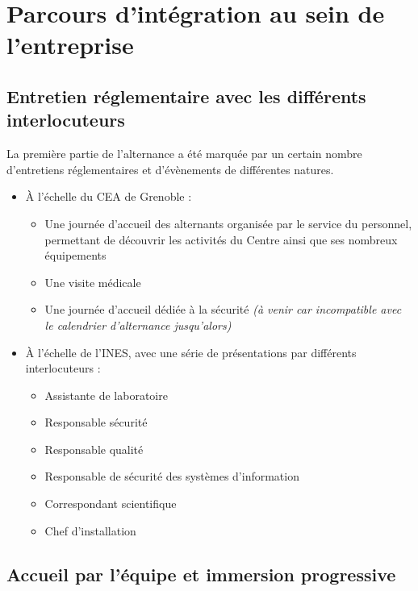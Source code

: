 \chapter{Parcours d'intégration au sein de l'entreprise}\label{ch:parcours-d'integration-au-sein-de-l'entreprise}


\section{Entretien réglementaire avec les différents interlocuteurs}\label{sec:entretien-reglementaire-avec-les-differents-interlocuteurs}

    La première partie de l'alternance a été marquée par un certain nombre d'entretiens réglementaires et d'évènements de différentes natures.

    \begin{itemize}
        \item À l'échelle du \gls{CEA} de Grenoble :
        \begin{itemize}
            \item Une journée d'accueil des alternants organisée par le service du personnel, permettant de découvrir les activités du Centre ainsi que ses nombreux équipements
            \item Une visite médicale
            \item Une journée d'accueil dédiée à la sécurité \textit{(à venir car incompatible avec le calendrier d'alternance jusqu'alors)}
        \end{itemize}
        \item À l'échelle de l'\gls{INES}, avec une série de présentations par différents interlocuteurs :
        \begin{itemize}
            \item Assistante de laboratoire
            \item Responsable sécurité
            \item Responsable qualité
            \item Responsable de sécurité des systèmes d'information
            \item Correspondant scientifique
            \item Chef d'installation
        \end{itemize}
    \end{itemize}
\section{Accueil par l'équipe et immersion progressive}\label{sec:accueil-par-l'equipe-et-immersion-progressive}

